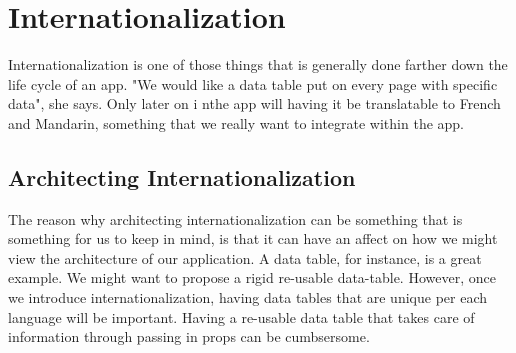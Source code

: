 \maketitle{}
\section{ Internationalization }

Internationalization is one of those things that is generally done farther down
the life cycle of an app. "We would like a data table put on every page with
specific data", she says. Only later on i nthe app will having it be
translatable to French and Mandarin, something that we really want to integrate
within the app.

\subsection{ Architecting Internationalization }
The reason why architecting internationalization can be something that is
something for us to keep in mind, is that it can have an affect on how we might
view the architecture of our application. A data table, for instance, is a great
example. We might want to propose a rigid re-usable data-table. However, once
we introduce internationalization, having data tables that are unique per each
language will be important. Having a re-usable data table that takes care of
information through passing in props can be cumbsersome.
